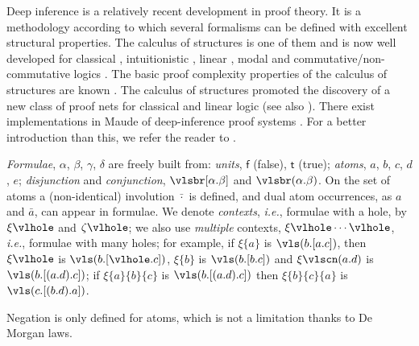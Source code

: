\documentclass[a4paper]{LMCS}
\begin{document}
Deep inference is a relatively recent development in proof theory. It is a methodology according to which several formalisms can be defined with excellent structural properties. The calculus of structures \cite{Gugl:06:A-System:kl} is one of them and is now well developed for classical \cite{Brun:03:Atomic-C:oz,Brun:06:Cut-Elim:cq,Brun:06:Locality:zh,BrunTiu:01:A-Local-:mz,Brun:06:Deep-Inf:qy}, intuitionistic \cite{Tiu:06:A-Local-:gf}, linear \cite{Stra:02:A-Local-:ul,Stra:03:MELL-in-:oy}, modal \cite{Brun::Deep-Seq:ay,GoreTiu:06:Classica:uq,Stou:06:A-Deep-I:rt} and commutative/non-commutative logics \cite{Gugl:06:A-System:kl,Tiu:06:A-System:ai,Stra:03:Linear-L:lp,Brus:02:A-Purely:wd,Di-G:04:Structur:wy,GuglStra:01:Non-comm:rp,GuglStra:02:A-Non-co:lq,GuglStra:02:A-Non-co:dq,Kahr:06:Reducing:hc,Kahr:07:System-B:fk}. The basic proof complexity properties of the calculus of structures are known \cite{BrusGugl:07:On-the-P:fk}. The calculus of structures promoted the discovery of a new class of proof nets for classical and linear logic \cite{LamaStra:05:Construc:qq,LamaStra:05:Naming-P:ov,LamaStra:06:From-Pro:et,StraLama:04:On-Proof:ec} (see also \cite{Guir:06:The-Thre:qt}). There exist implementations in Maude of deep-inference proof systems \cite{Kahr:07:Maude-as:lr}. For a better introduction than this, we refer the reader to \cite{Brun:03:Atomic-C:oz}.

\begin{defi}
\emph{Formulae}, $\alpha$, $\beta$, $\gamma$, $\delta$ are freely built from: \emph{units}, ${\mathsf f}$ (false), ${\mathsf t}$ (true); \emph{atoms}, $a$, $b$, $c$, $d$, $e$; \emph{disjunction} and \emph{conjunction}, ${\vlsbr[\alpha.\beta]}$ and $\vlsbr(\alpha.\beta)$. On the set of atoms a (non-identical) involution $\bar\cdot$ is defined, and dual atom occurrences, as $a$ and $\bar a$, can appear in formulae. We denote \emph{contexts}, \emph{i.e.}, formulae with a hole, by $\xi\vlhole$ and $\zeta\vlhole$; we also use \emph{multiple} contexts, $\xi\vlhole\cdots\vlhole$, \emph{i.e.}, formulae with many holes; for example, if $\xi\{a\}$ is $\vls(b.[a.c])$, then $\xi\vlhole$ is $\vls(b.[\vlhole.c])$, $\xi\{b\}$ is $\vls(b.[b.c])$ and $\xi\vlscn(a.d)$ is $\vls(b.[(a.d).c])$; if $\xi\{a\}\{b\}\{c\}$ is $\vls(b.[(a.d).c])$ then $\xi\{b\}\{c\}\{a\}$ is $\vls(c.[(b.d).a])$.
\end{defi}

\begin{rem}
Negation is only defined for atoms, which is not a limitation thanks to De Morgan laws.
\end{rem}
\end{document}
